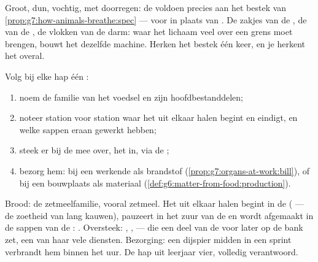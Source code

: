 \begin{example}\label{ex:g7:digestion-and-nutrients:spec}
Groot, dun, vochtig, met  doorregen: de  voldoen precies
aan het bestek van \cref{prop:g7:how-animals-breathe:spec} --- voor
 in plaats van . De zakjes van de , de 
van de , de vlokken van de darm: waar het lichaam veel over een
grens moet brengen, bouwt het dezelfde machine. Herken het bestek één
keer, en je herkent het overal.
\end{example}

\begin{method}\label{met:g7:digestion-and-nutrients:trace}
Volg bij elke hap één :
\begin{enumerate}
  \item noem de familie van het voedsel en zijn hoofdbestanddelen;
  \item noteer station voor station waar het uit elkaar halen begint en
        eindigt, en welke sappen eraan gewerkt hebben;
  \item steek er bij de  mee over, het  in, via de ;
  \item bezorg hem: bij een werkende  als brandstof
        (\cref{prop:g7:organs-at-work:bill}), of bij een bouwplaats als
        materiaal (\cref{def:g6:matter-from-food:production}).
\end{enumerate}
\end{method}

\begin{example}\label{ex:g7:digestion-and-nutrients:breadtrace}
Brood: de zetmeelfamilie, vooral zetmeel. Het uit elkaar halen begint in
de  ( --- de zoetheid van lang kauwen), pauzeert in het zuur
van de  en wordt afgemaakt in de sappen van de : .
Oversteek: , ,  --- die een deel van de  voor
later op de bank zet, een van haar vele diensten. Bezorging: een dijspier
midden in een sprint verbrandt hem binnen het uur. De hap uit leerjaar
vier, volledig verantwoord.
\end{example}

